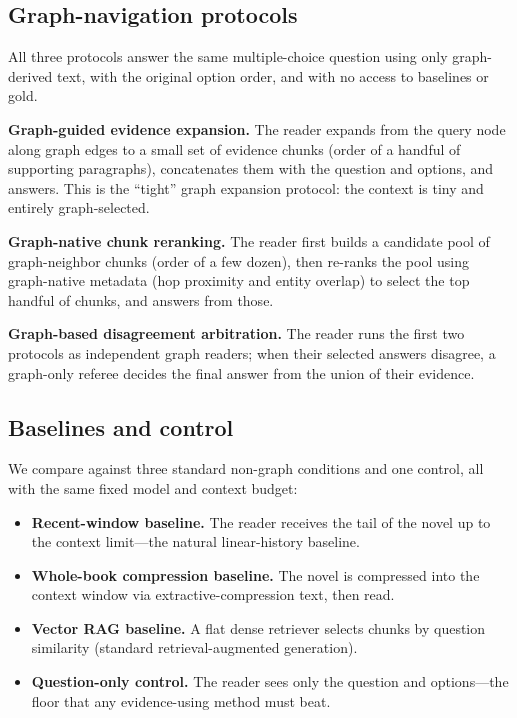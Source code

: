 \documentclass{article}
\begin{document}
\subsection{Graph-navigation protocols}
\label{sec:protocols}

All three protocols answer the same multiple-choice question using only
graph-derived text, with the original option order, and with no access to
baselines or gold.

\textbf{Graph-guided evidence expansion.} The reader expands from the query node
along graph edges to a small set of evidence chunks (order of a handful of
supporting paragraphs), concatenates them with the question and options, and
answers. This is the ``tight'' graph expansion protocol: the context is tiny and
entirely graph-selected.

\textbf{Graph-native chunk reranking.} The reader first builds a candidate pool
of graph-neighbor chunks (order of a few dozen), then re-ranks the pool using
graph-native metadata (hop proximity and entity overlap) to select the top
handful of chunks, and answers from those.

\textbf{Graph-based disagreement arbitration.} The reader runs the first two
protocols as independent graph readers; when their selected answers disagree, a
graph-only referee decides the final answer from the union of their evidence.

\subsection{Baselines and control}
\label{sec:baselines}

We compare against three standard non-graph conditions and one control, all with
the same fixed model and context budget:
\begin{itemize}
\item \textbf{Recent-window baseline.} The reader receives the tail of the novel
  up to the context limit---the natural linear-history baseline.
\item \textbf{Whole-book compression baseline.} The novel is compressed into the
  context window via extractive-compression text, then read.
\item \textbf{Vector RAG baseline.} A flat dense retriever selects chunks by
  question similarity (standard retrieval-augmented generation).
\item \textbf{Question-only control.} The reader sees only the question and
  options---the floor that any evidence-using method must beat.
\end{itemize}
\end{document}
